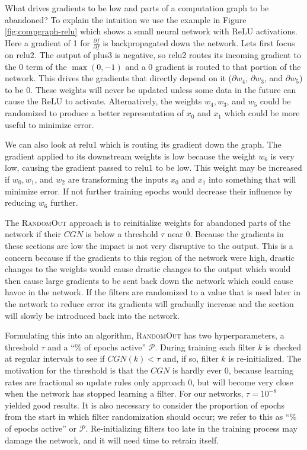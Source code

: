 \documentclass{article}
\begin{document}
What drives gradients to be low and parts of a computation graph to be abandoned? To explain the intuition we use the example in Figure \ref{fig:compgraph-relu} %
which shows a small neural network with ReLU activations. Here a gradient of 1 for $\frac{\partial f}{\partial f}$ is backpropagated down the network. Lets first focus on relu2. The output of plus3 is negative, so relu2 routes its incoming gradient to the 0 term of the $\max(0,-1)$ and a 0 gradient is routed to that portion of the network. This drives the gradients that directly depend on it ($\partial w_4$, $\partial w_3$, and $\partial w_5$) to be 0. These weights will never be updated unless some data in the future can cause the ReLU to activate. Alternatively, the weights $w_4, w_3$, and $w_5$ could be randomized to produce a better representation of $x_0$ and $x_1$ which could be more useful to minimize error.

We can also look at relu1 which is routing its gradient down the graph. The gradient applied to its downstream weights is low because the weight $w_6$ is very low, causing the gradient passed to relu1 to be low. This weight may be increased if $w_0, w_1$, and $w_2$ are transforming the inputs $x_0$ and $x_1$ into something that will minimize error. If not further training epochs would decrease their influence by reducing $w_6$ further. 

	 	 


The \textsc{RandomOut} approach is to reinitialize weights for abandoned parts of the network if their $CGN$ is below a threshold $\tau$ near 0. Because the gradients in these sections are low the impact is not very disruptive to the output. This is a concern because if the gradients to this region of the network were high, drastic changes to the weights would cause drastic changes to the output which would then cause large gradients to be sent back down the network which could cause havoc in the network. If the filters are randomized to a value that is used later in the network to reduce error its gradients will gradually increase and the section will slowly be introduced back into the network.
	

Formulating this into an algorithm, \textsc{RandomOut} has two hyperparameters, a threshold $\tau$ and a ``\% of epochs active'' $\mathcal{P}$. During training each filter $k$ is checked at regular intervals to see if $CGN(k) < \tau$ and, if so, filter $k$ is re-initialized. The motivation for the threshold is that the $CGN$ is hardly ever 0, because learning rates are fractional so update rules only approach 0, but will become very close when the network has stopped learning a filter. For our networks, $\tau = 10^{-8}$ yielded good results. It is also necessary to consider the proportion of epochs from the start in which filter randomization should occur; we refer to this as ``\% of epochs active'' or $\mathcal{P}$. Re-initializing filters too late in the training process may damage the network, and it will need time to retrain itself. 
\end{document}
